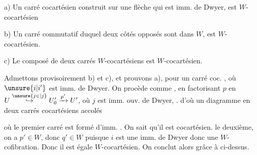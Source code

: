 a) Un carré cocartésien construit sur une flèche qui est imm. de Dwyer, est  $W$-cocartésien

b) Un carré commutatif  duquel deux côtés opposés sont dans $W$, est $W$-cocartésien.

c) Le composé de deux carrés $W$-cocartésiens est $W$-cocartésien.

Admettons provisoirement b) et c), et prouvons a), pour un carré coc.
, où $\unsure{i|i'}$ est imm.  de Dwyer. On procède  comme , en factorisant $p$ en $U\overset{\unsure{j\in|j}}{\hookrightarrow}U'_0\xrightarrow{p'}U'$, où $j$ est imm. ouv. de Dwyer,  . d'où un diagramme en deux carrés cocartésiens accolés


où le premier carré est formé d'imm. . On sait  qu'il est cocartésien.  le deuxième, on a $p'\in W$, donc $q'\in W$ puisque $i$ est une imm. de Dwyer donc une $W$-cofibration. Donc il est égale $W$-cocartésien. On conclut alors grâce à  ci-dessus.

